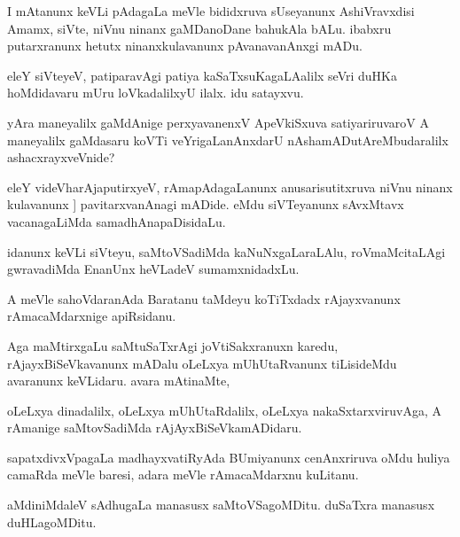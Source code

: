 \documentclass{article}
\begin{document}
\begin{mn}%
I mAtanunx keVLi pAdagaLa meVle bididxruva sUseyanunx AshiVravxdisi Amamx, siVte, niVnu 
ninanx gaMDanoDane bahukAla bALu. ibabxru putarxranunx hetutx ninanxkulavanunx 
pAvanavanAnxgi mADu.
\end{mn}

\begin{mn}%
eleY siVteyeV, patiparavAgi patiya kaSaTxsuKagaLAalilx seVri duHKa hoMdidavaru mUru 
loVkadalilxyU ilalx. idu satayxvu.
\end{mn}

\begin{mn}%
yAra maneyalilx gaMdAnige perxyavanenxV ApeVkiSxuva satiyariruvaroV A maneyalilx gaMdasaru 
koVTi veYrigaLanAnxdarU nAshamADutAreMbudaralilx ashacxrayxveVnide?
\end{mn}

\begin{mn}%
eleY videVharAjaputirxyeV, rAmapAdagaLanunx anusarisutitxruva niVnu ninanx kulavanunx ]
pavitarxvanAnagi mADide. eMdu siVTeyanunx sAvxMtavx vacanagaLiMda samadhAnapaDisidaLu.
\end{mn}

\begin{mn}%
idanunx keVLi siVteyu, saMtoVSadiMda kaNuNxgaLaraLAlu, roVmaMcitaLAgi gwravadiMda EnanUnx 
heVLadeV sumamxnidadxLu.
\end{mn}

\begin{mn}%
A meVle sahoVdaranAda Baratanu taMdeyu koTiTxdadx rAjayxvanunx rAmacaMdarxnige apiRsidanu.
\end{mn}

\begin{mn}%
Aga maMtirxgaLu saMtuSaTxrAgi joVtiSakxranuxn karedu, rAjayxBiSeVkavanunx mADalu oLeLxya 
mUhUtaRvanunx tiLisideMdu avaranunx keVLidaru. avara mAtinaMte,
\end{mn}

\begin{mn}%
oLeLxya dinadalilx, oLeLxya mUhUtaRdalilx, oLeLxya nakaSxtarxviruvAga, A rAmanige 
saMtovSadiMda rAjAyxBiSeVkamADidaru.
\end{mn}

\begin{mn}%
sapatxdivxVpagaLa madhayxvatiRyAda BUmiyanunx cenAnxriruva oMdu huliya camaRda meVle 
baresi, adara meVle rAmacaMdarxnu kuLitanu.
\end{mn}

\begin{mn}%
aMdiniMdaleV sAdhugaLa manasusx saMtoVSagoMDitu. duSaTxra manasusx duHLagoMDitu.
\end{mn}
\end{document}
